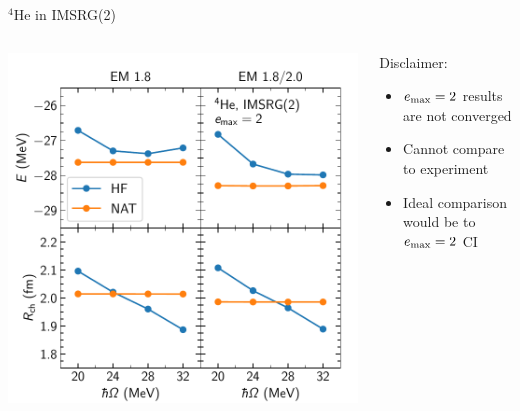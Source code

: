 \documentclass[aspectratio=169]{beamer}
\begin{document}
\begin{frame}{${}^{4}\text{He}$ in IMSRG(2)}
\begin{columns}
\begin{column}{0.45\textwidth}
\begin{overprint}
        \centering\includegraphics[width=\textwidth]{thesis/talk/images/he4_imsrg2_results.pdf}
      \end{overprint}
    \end{column}
    \begin{column}{0.55\textwidth}
      Disclaimer:\\
      \begin{itemize}
        \item $e_{\text{max}}=2$ results are not converged
        \item Cannot compare to experiment
        \item Ideal comparison would be to $e_{\text{max}}=2$ CI
      \end{itemize}
    \end{column}
  \end{columns}
\end{frame}
\end{document}
